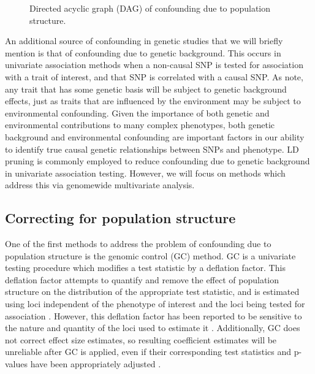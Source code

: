 \begin{figure}[H]
\centering
{}
\caption{Directed acyclic graph (DAG) of confounding due to population structure.}
\label{fig:ps_env}
\end{figure}

An additional source of confounding in genetic studies that we will briefly mention is that of confounding due to genetic background. This occurs in univariate association methods when a non-causal SNP is tested for association with a trait of interest, and that SNP is correlated with a causal SNP. As \citet{vilhjalmsson2012nature} note, any trait that has some genetic basis will be subject to genetic background effects, just as traits that are influenced by the environment may be subject to environmental confounding. Given the importance of both genetic and environmental contributions to many complex phenotypes, both genetic background and environmental confounding are important factors in our ability to identify true causal genetic relationships between SNPs and phenotype. LD pruning is commonly employed to reduce confounding due to genetic background in univariate association testing. However, we will focus on methods which address this via genomewide multivariate analysis.

\subsection{Correcting for population structure}

One of the first methods to address the problem of confounding due to population structure is the genomic control (GC) method. GC is a univariate testing procedure which modifies a test statistic by a deflation factor. This deflation factor attempts to quantify and remove the effect of population structure on the distribution of the appropriate test statistic, and is estimated using loci independent of the phenotype of interest and the loci being tested for association \citep{devlin1999genomic, bacanu2000power, wang2009testing}. However, this deflation factor has been reported to be sensitive to the nature and quantity of the loci used to estimate it \citep{hellwege2017population, marchini2004effects}. Additionally, GC does not correct effect size estimates, so resulting coefficient estimates will be unreliable after GC is applied, even if their corresponding test statistics and p-values have been appropriately adjusted \citep{hellwege2017population}.

